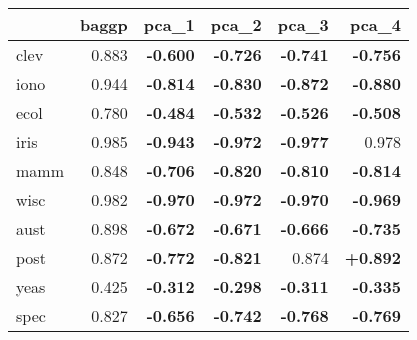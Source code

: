 \begin{tabular}{lrrrrr}
\toprule
{} &  baggp &  pca\_1 &  pca\_2 &  pca\_3 &  pca\_4 \\
\midrule
clev & 0.883 &    \textbf{-0.600} &    \textbf{-0.726} &    \textbf{-0.741} &    \textbf{-0.756} \\
iono & 0.944 &    \textbf{-0.814} &    \textbf{-0.830} &    \textbf{-0.872} &    \textbf{-0.880} \\
ecol & 0.780 &    \textbf{-0.484} &    \textbf{-0.532} &    \textbf{-0.526} &    \textbf{-0.508} \\
iris & 0.985 &    \textbf{-0.943} &    \textbf{-0.972} &    \textbf{-0.977} & 0.978 \\
mamm & 0.848 &    \textbf{-0.706} &    \textbf{-0.820} &    \textbf{-0.810} &    \textbf{-0.814} \\
wisc & 0.982 &    \textbf{-0.970} &    \textbf{-0.972} &    \textbf{-0.970} &    \textbf{-0.969} \\
aust & 0.898 &    \textbf{-0.672} &    \textbf{-0.671} &    \textbf{-0.666} &    \textbf{-0.735} \\
post & 0.872 &    \textbf{-0.772} &    \textbf{-0.821} & 0.874 & \textbf{+0.892} \\
yeas & 0.425 &    \textbf{-0.312} &    \textbf{-0.298} &    \textbf{-0.311} &    \textbf{-0.335} \\
spec & 0.827 &    \textbf{-0.656} &    \textbf{-0.742} &    \textbf{-0.768} &    \textbf{-0.769} \\
\bottomrule
\end{tabular}
